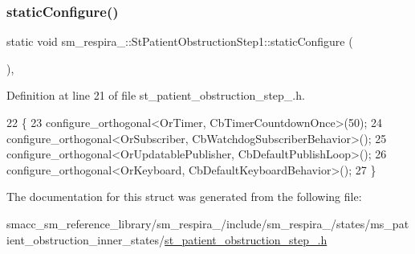 \subsubsection{\texorpdfstring{static\+Configure()}{staticConfigure()}}
{\footnotesize\ttfamily static void sm\+\_\+respira\+\_\+::\+St\+Patient\+Obstruction\+Step1\+::static\+Configure (\begin{DoxyParamCaption}{ }\end{DoxyParamCaption})\hspace{0.3cm}{\ttfamily [inline]}, {\ttfamily [static]}}



Definition at line 21 of file st\+\_\+patient\+\_\+obstruction\+\_\+step\+\_.\+h.


\begin{DoxyCode}
22     \{
23         configure\_orthogonal<OrTimer, CbTimerCountdownOnce>(50);
24         configure\_orthogonal<OrSubscriber, CbWatchdogSubscriberBehavior>();
25         configure\_orthogonal<OrUpdatablePublisher, CbDefaultPublishLoop>();
26         configure\_orthogonal<OrKeyboard, CbDefaultKeyboardBehavior>();
27     \}
\end{DoxyCode}


The documentation for this struct was generated from the following file\+:\begin{DoxyCompactItemize}
\item 
smacc\+\_\+sm\+\_\+reference\+\_\+library/sm\+\_\+respira\+\_/include/sm\+\_\+respira\+\_/states/ms\+\_\+patient\+\_\+obstruction\+\_\+inner\+\_\+states/\hyperlink{st__patient__obstruction__step__1_8h}{st\+\_\+patient\+\_\+obstruction\+\_\+step\+\_.\+h}\end{DoxyCompactItemize}
